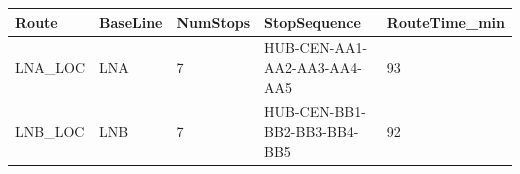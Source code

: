 \begin{tabular}{lllll}
\toprule
Route & BaseLine & NumStops & StopSequence & RouteTime\_min \\
\midrule
LNA\_LOC & LNA & 7 & HUB-CEN-AA1-AA2-AA3-AA4-AA5 & 93 \\
LNB\_LOC & LNB & 7 & HUB-CEN-BB1-BB2-BB3-BB4-BB5 & 92 \\
\bottomrule
\end{tabular}
